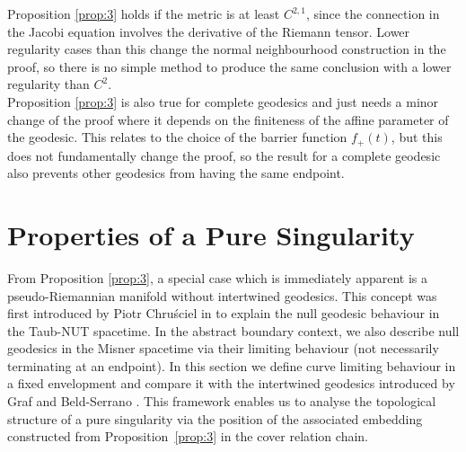 \documentclass[pdflatex,sn-mathphys-num]{sn-jnl}
\newcommand{\Junbang}[1]{{\color{magenta}#1}}
\theoremstyle{definition}
\begin{document}
Proposition \ref{prop:3} holds if the metric is at least $C^{2,1}$, since the connection in the Jacobi equation involves the derivative of the Riemann tensor. Lower regularity cases than this change the normal neighbourhood construction in the proof, so there is no simple method to produce the same conclusion with a lower regularity than $C^{2}$.\\

Proposition \ref{prop:3} is also true for complete geodesics and just needs a minor change of the proof where it depends on the finiteness of the affine parameter of the geodesic. This relates to the choice of the barrier function $f_+(t)$, but this does not fundamentally change the proof, so the result for a complete geodesic also prevents other geodesics from having the same endpoint.

\section{Properties of a Pure Singularity}\label{section 4}
From Proposition \ref{prop:3}, a special case which is immediately apparent is a pseudo-Riemannian manifold without intertwined geodesics. This concept was first introduced by Piotr Chru\'{s}ciel in \cite{chrusciel2006conformalboundaryextensionslorentzian} to explain the null geodesic behaviour in the Taub-NUT spacetime. In the abstract boundary context, we also describe null geodesics in the Misner spacetime via their limiting behaviour (not necessarily terminating at an endpoint). In this section we define curve limiting behaviour in a fixed envelopment and compare it with the intertwined geodesics introduced by Graf and Beld-Serrano \cite{Graf_2024}. This framework enables us to analyse the topological structure of a pure singularity via the position of the associated embedding constructed from Proposition~\ref{prop:3} in the cover relation chain.\\
\end{document}
